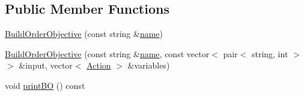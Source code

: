 \subsection*{Public Member Functions}
\begin{DoxyCompactItemize}
\item 
\hyperlink{classghost_1_1BuildOrderObjective_a8603f1e064d7bda83a19fec8fb8cc3cb}{Build\-Order\-Objective} (const string \&\hyperlink{classghost_1_1Objective_ae9533a52b3600c826df6e20c65db1e7a}{name})
\item 
\hyperlink{classghost_1_1BuildOrderObjective_a8ee0f6c2ae3116ba32508fcec9975471}{Build\-Order\-Objective} (const string \&\hyperlink{classghost_1_1Objective_ae9533a52b3600c826df6e20c65db1e7a}{name}, const vector$<$ pair$<$ string, int $>$ $>$ \&input, vector$<$ \hyperlink{classghost_1_1Action}{Action} $>$ \&variables)
\item 
void \hyperlink{classghost_1_1BuildOrderObjective_a04c8eff1ac3b0c98f8520189d5b75f9f}{print\-B\-O} () const 
\end{DoxyCompactItemize}
